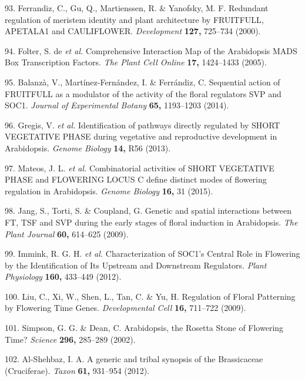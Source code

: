 \documentclass[12pt,]{book}
\begin{document}
\hypertarget{ref-ferrandiz_redundant_2000}{}
93. Ferrandiz, C., Gu, Q., Martienssen, R. \& Yanofsky, M. F. Redundant
regulation of meristem identity and plant architecture by FRUITFULL,
APETALA1 and CAULIFLOWER. \emph{Development} \textbf{127,} 725--734
(2000).

\hypertarget{ref-folter_comprehensive_2005}{}
94. Folter, S. de \emph{et al.} Comprehensive Interaction Map of the
Arabidopsis MADS Box Transcription Factors. \emph{The Plant Cell Online}
\textbf{17,} 1424--1433 (2005).

\hypertarget{ref-balanza_sequential_2014}{}
95. Balanzà, V., Martínez-Fernández, I. \& Ferrándiz, C. Sequential
action of FRUITFULL as a modulator of the activity of the floral
regulators SVP and SOC1. \emph{Journal of Experimental Botany}
\textbf{65,} 1193--1203 (2014).

\hypertarget{ref-gregis_identification_2013}{}
96. Gregis, V. \emph{et al.} Identification of pathways directly
regulated by SHORT VEGETATIVE PHASE during vegetative and reproductive
development in Arabidopsis. \emph{Genome Biology} \textbf{14,} R56
(2013).

\hypertarget{ref-mateos_combinatorial_2015}{}
97. Mateos, J. L. \emph{et al.} Combinatorial activities of SHORT
VEGETATIVE PHASE and FLOWERING LOCUS C define distinct modes of
flowering regulation in Arabidopsis. \emph{Genome Biology} \textbf{16,}
31 (2015).

\hypertarget{ref-jang_genetic_2009}{}
98. Jang, S., Torti, S. \& Coupland, G. Genetic and spatial interactions
between FT, TSF and SVP during the early stages of floral induction in
Arabidopsis. \emph{The Plant Journal} \textbf{60,} 614--625 (2009).

\hypertarget{ref-immink_characterization_2012}{}
99. Immink, R. G. H. \emph{et al.} Characterization of SOC1's Central
Role in Flowering by the Identification of Its Upstream and Downstream
Regulators. \emph{Plant Physiology} \textbf{160,} 433--449 (2012).

\hypertarget{ref-liu_regulation_2009}{}
100. Liu, C., Xi, W., Shen, L., Tan, C. \& Yu, H. Regulation of Floral
Patterning by Flowering Time Genes. \emph{Developmental Cell}
\textbf{16,} 711--722 (2009).

\hypertarget{ref-simpson_arabidopsis_2002}{}
101. Simpson, G. G. \& Dean, C. Arabidopsis, the Rosetta Stone of
Flowering Time? \emph{Science} \textbf{296,} 285--289 (2002).

\hypertarget{ref-al_shehbaz_generic_2012}{}
102. Al-Shehbaz, I. A. A generic and tribal synopsis of the Brassicaceae
(Cruciferae). \emph{Taxon} \textbf{61,} 931--954 (2012).
\end{document}
